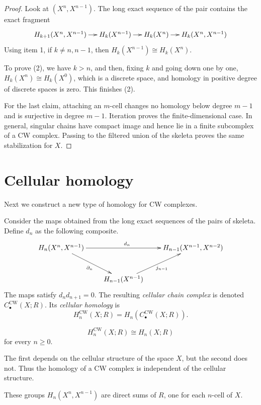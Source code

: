 \begin{proof}
Look at $(X^n,X^{n-1})$. The long exact
sequence of the pair contains the exact
fragment
$$
\xymatrix@C=1.2em{
H_{k+1}(X^n,X^{n-1}) \ar[r]
 & H_k(X^{n-1}) \ar[r]
 & H_k(X^n) \ar[r]
 & H_k(X^n,X^{n-1})
}
$$
Using item 1, if $k\neq n,n-1$, then
$H_k(X^{n-1})\cong H_k(X^n)$.

To prove (2), we have $k>n$, and then, fixing
$k$ and going
down one by one, $H_k(X^n)\cong H_k(X^0)$,
which is a
discrete space, and homology in positive
degree of discrete
spaces is zero. This finishes (2).

For the last claim, attaching an $m$-cell
changes no homology below degree $m-1$ and is
surjective in degree $m-1$. Iteration proves
the finite-dimensional case. In general,
singular chains have compact image and hence
lie in a finite subcomplex of a CW complex.
Passing to the filtered union of the skeleta
proves the same stabilization for $X$.
\end{proof}
\section{Cellular homology}
\label{section-cellular-homology}

Next we construct a new type of homology for
CW complexes.

\begin{definition}
Consider the maps obtained from the long
exact sequences of
the pairs of skeleta. Define $d_n$ as the
following composite.
$$
\xymatrix@C=2.2em@R=2.8em{
H_n(X^n,X^{n-1})
  \ar[rr]^{d_n}
  \ar[dr]_{\partial_n}
 & & H_{n-1}(X^{n-1},X^{n-2}) \\
 & H_{n-1}(X^{n-1})
   \ar[ur]_{j_{n-1}}
 &
}
$$
The maps satisfy $d_n d_{n+1}=0$. The
resulting \emph{cellular chain complex} is
denoted $C_\bullet^{\mathrm{CW}}(X;R)$.
Its \emph{cellular homology} is
$$
H_n^{\mathrm{CW}}(X;R)
=H_n(C_\bullet^{\mathrm{CW}}(X;R)).
$$
\end{definition}

\begin{theorem}
$$
H_n^{\mathrm{CW}}(X;R)
\cong H_n(X;R)
$$
for every $n\geq0$.
\end{theorem}

The first depends on the cellular structure
of the space $X$,
but the second does not. Thus the homology of
a CW complex is
independent of the cellular structure.

\begin{remark}
\label{remark-cellular-chain-groups}
These groups $H_n(X^n,X^{n-1})$ are direct
sums of $R$, one
for each $n$-cell of $X$.
\end{remark}

